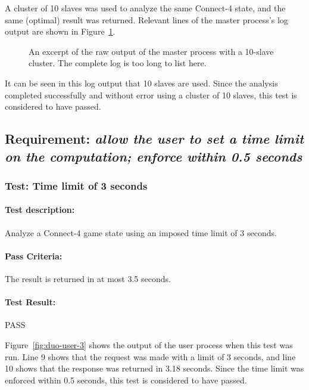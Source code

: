 \documentclass[pdftex,12pt,a4paper]{article}
\begin{document}
A cluster of 10 slaves was used to analyze the same Connect-4 state, and the same (optimal) result was returned. Relevant lines of the master process's log output are shown in Figure~\ref{fig:master-3}.

\begin{figure}[h]

\caption{An excerpt of the raw output of the master process with a 10-slave cluster. The complete log is too long to list here.}
\label{fig:master-3}
\end{figure}

It can be seen in this log output that 10 slaves are used. Since the analysis completed successfully and without error using a cluster of 10 slaves, this test is considered to have passed.

\subsection{\textbf{Requirement:} \emph{allow the user to set a time limit on the computation; enforce within 0.5 seconds}}

\subsubsection{\textbf{Test:} Time limit of 3 seconds}

\paragraph{Test description:} Analyze a Connect-4 game state using an imposed time limit of 3 seconds. 

\paragraph{Pass Criteria:} The result is returned in at most 3.5 seconds.

\paragraph{Test Result:} PASS

Figure~\ref{fig:duo-user-3} shows the output of the user process when this test was run. Line 9 shows that the request was made with a limit of 3 seconds, and line 10 shows that the response was returned in 3.18 seconds. Since the time limit was enforced within 0.5 seconds, this test is considered to have passed.

\end{document}
